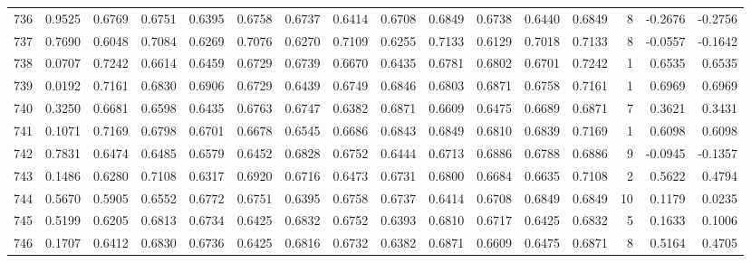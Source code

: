 \begin{tabular}{lrrrrrrrrrrrrrrr}
736 &      0.9525 &  0.6769 &  0.6751 &  0.6395 &  0.6758 &  0.6737 &  0.6414 &  0.6708 &  0.6849 &  0.6738 &   0.6440 &     0.6849 &      8 &                   -0.2676 &                    -0.2756 \\
737 &      0.7690 &  0.6048 &  0.7084 &  0.6269 &  0.7076 &  0.6270 &  0.7109 &  0.6255 &  0.7133 &  0.6129 &   0.7018 &     0.7133 &      8 &                   -0.0557 &                    -0.1642 \\
738 &      0.0707 &  0.7242 &  0.6614 &  0.6459 &  0.6729 &  0.6739 &  0.6670 &  0.6435 &  0.6781 &  0.6802 &   0.6701 &     0.7242 &      1 &                    0.6535 &                     0.6535 \\
739 &      0.0192 &  0.7161 &  0.6830 &  0.6906 &  0.6729 &  0.6439 &  0.6749 &  0.6846 &  0.6803 &  0.6871 &   0.6758 &     0.7161 &      1 &                    0.6969 &                     0.6969 \\
740 &      0.3250 &  0.6681 &  0.6598 &  0.6435 &  0.6763 &  0.6747 &  0.6382 &  0.6871 &  0.6609 &  0.6475 &   0.6689 &     0.6871 &      7 &                    0.3621 &                     0.3431 \\
741 &      0.1071 &  0.7169 &  0.6798 &  0.6701 &  0.6678 &  0.6545 &  0.6686 &  0.6843 &  0.6849 &  0.6810 &   0.6839 &     0.7169 &      1 &                    0.6098 &                     0.6098 \\
742 &      0.7831 &  0.6474 &  0.6485 &  0.6579 &  0.6452 &  0.6828 &  0.6752 &  0.6444 &  0.6713 &  0.6886 &   0.6788 &     0.6886 &      9 &                   -0.0945 &                    -0.1357 \\
743 &      0.1486 &  0.6280 &  0.7108 &  0.6317 &  0.6920 &  0.6716 &  0.6473 &  0.6731 &  0.6800 &  0.6684 &   0.6635 &     0.7108 &      2 &                    0.5622 &                     0.4794 \\
744 &      0.5670 &  0.5905 &  0.6552 &  0.6772 &  0.6751 &  0.6395 &  0.6758 &  0.6737 &  0.6414 &  0.6708 &   0.6849 &     0.6849 &     10 &                    0.1179 &                     0.0235 \\
745 &      0.5199 &  0.6205 &  0.6813 &  0.6734 &  0.6425 &  0.6832 &  0.6752 &  0.6393 &  0.6810 &  0.6717 &   0.6425 &     0.6832 &      5 &                    0.1633 &                     0.1006 \\
746 &      0.1707 &  0.6412 &  0.6830 &  0.6736 &  0.6425 &  0.6816 &  0.6732 &  0.6382 &  0.6871 &  0.6609 &   0.6475 &     0.6871 &      8 &                    0.5164 &                     0.4705 \\

\end{tabular}
